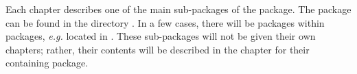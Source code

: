 \begin{FiPyDocumentationExample}
    
    \chapterheadstart
    {
     \afterchaptertitle
    }
    
    Each chapter describes one of the main sub-packages of the
     package.  The
     package can be found in the
    directory .  In a few cases, there will be
    packages within packages, \emph{e.g.}
     located in
    .  These sub-packages
    will not be given their own chapters; rather, their contents will
    be described in the chapter for their containing package.
    
    
    

\end{FiPyDocumentationExample}
